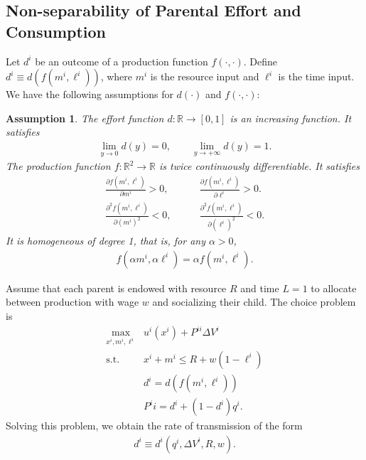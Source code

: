 \documentclass[12pt]{article}
\newtheorem{assumption}{Assumption}
\begin{document}
\subsection{Non-separability of Parental Effort and Consumption}
Let $d^i$ be an outcome of a production function $f(\cdot, \cdot)$. Define $d^i\equiv d\left(f(m^i,\ell^i)\right)$, where $m^i$ is the resource input and $\ell^i$ is the time input. We have the following assumptions for $d(\cdot)$ and $f(\cdot, \cdot)$:
\begin{assumption}
    The effort function $d: \mathbb{R}\rightarrow [0,1]$ is an increasing function. It satisfies
    \begin{align}
        \lim_{y\rightarrow 0} d(y)=0,\qquad \lim_{y\rightarrow +\infty} d(y)=1.\label{eq:effort_fcn_cond}
    \end{align}
    The production function $f: \mathbb{R}^2\rightarrow \mathbb{R}$ is twice continuously differentiable. It satisfies 
    \begin{align}
        \frac{\partial f(m^i, \ell^i)}{\partial m^i}>0,& \qquad \frac{\partial f(m^i, \ell^i)}{\partial \ell^i}>0.\label{eq:prod_fcn_increasing} \\
        \frac{\partial^2 f(m^i, \ell^i)}{\partial \left(m^i\right)^2}<0,& \qquad \frac{\partial^2 f(m^i, \ell^i)}{\partial \left(\ell^i\right)^2}<0.\label{eq:prod_fcn_concave}
    \end{align}
    It is homogeneous of degree 1, that is, for any $\alpha>0$, 
    \begin{align}
        f(\alpha m^i, \alpha \ell^i) = \alpha f(m^i, \ell^i).\label{eq:prod_fcn_homo1}
    \end{align}
\end{assumption}
Assume that each parent is endowed with resource $R$ and time $L=1$ to allocate between production with wage $w$ and socializing their child. The choice problem is
\begin{align}
    \max_{x^i, m^i, \ell^i}& u^i(x^i) + P^{ii} \Delta V^i \label{opt:nonsep_choice}\\
    \text{s.t.}& x^i + m^i \leq R + w(1-\ell^i)\nonumber \\
    & d^i = d(f(m^i, \ell^i))\nonumber \\
    & P^ii = d^i + (1-d^i)q^i \nonumber.
\end{align}
Solving this problem, we obtain the rate of transmission of the form
\begin{align}
    d^i\equiv d^i(q^i, \Delta V^i, R, w).\label{eq:trans_rate_v1}
\end{align}
\end{document}
